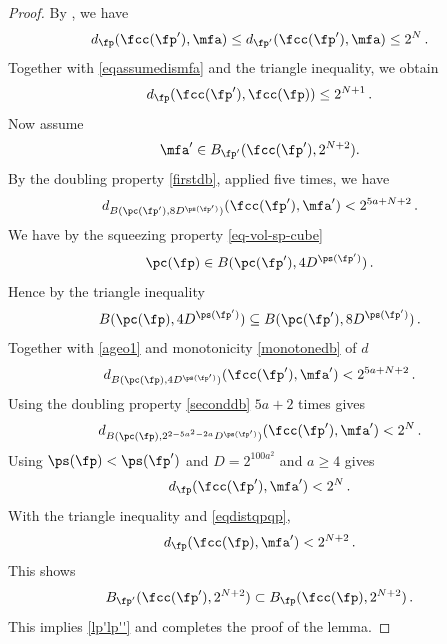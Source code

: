 \begin{proof}
\leanok
By , we have
\begin{equation}
     d_{\fp}(\fcc(\fp'),\mfa)
     \le d_{\fp'}(\fcc(\fp'),\mfa)
     \le 2^{N} \, .
\end{equation}
Together with \eqref{eqassumedismfa} and the triangle inequality, we obtain
\begin{equation}\label{eqdistqpqp}
    d_{\fp}(\fcc(\fp'),\fcc(\fp))\le 2^{N+1} \, .
\end{equation}
Now assume
\begin{equation}
    \mfa'\in B_{\fp'}(\fcc(\fp'),2^{N+2}).
\end{equation}
By the doubling property \eqref{firstdb}, applied five times, we have
\begin{equation}\label{ageo1} d_{B(\pc(\fp'),8D^{\ps(\fp')})}(\fcc(\fp'),\mfa') < 2^{5a+N+2}\, .
\end{equation}
We have by the squeezing property \eqref{eq-vol-sp-cube}
\begin{equation}
 \pc(\fp)\in
B(\pc(\fp'),4D^{\ps(\fp')})\, .
\end{equation}
Hence by the triangle inequality
\begin{equation}
 B(\pc(\fp), 4D^{\ps(\fp')})
 \subseteq
B(\pc(\fp'),8D^{\ps(\fp')})\, .
\end{equation}
Together with \eqref{ageo1} and monotonicity \eqref{monotonedb} of $d$
\begin{equation}
    d_{B(\pc(\fp),4D^{\ps(\fp')})}(\fcc(\fp'),\mfa') < 2^{5a+N+2}\, .
\end{equation}
Using the doubling property \eqref{seconddb} $5a+2$ times gives
\begin{equation}
    d_{B(\pc(\fp),2^{2-5a^2-2a}D^{\ps(\fp')})}(\fcc(\fp'),\mfa') < 2^{N}\, .
\end{equation}
Using $\ps(\fp)<\ps(\fp')$ and $D=2^{100a^2}$ and $a\ge 4$ gives
\begin{equation}
    d_{\fp}(\fcc(\fp'),\mfa') < 2^{N}\, .
\end{equation}
With the triangle inequality and \eqref{eqdistqpqp},
\begin{equation}
    d_{\fp}(\fcc(\fp),\mfa') < 2^{N+2}\, .
\end{equation}
This shows
\begin{equation}
B_{\fp'}(\fcc(\fp'),2^{N+2})\subset B_{\fp}(\fcc(\fp),2^{N+2})\, .
\end{equation}
This implies \eqref{lp'lp''} and completes the proof of the lemma.
\end{proof}

